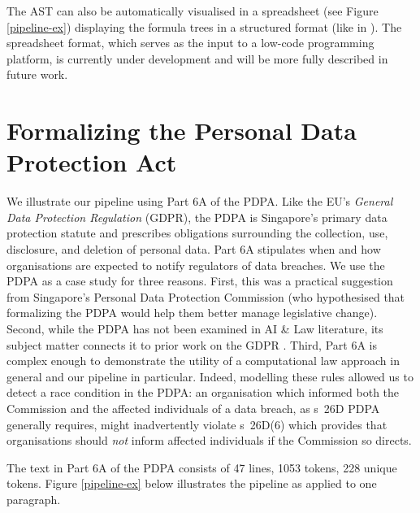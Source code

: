 \documentclass{IOS-Book-Article}
\begin{document}
The AST can also be automatically visualised in a spreadsheet (see Figure \ref{pipeline-ex}) displaying the formula trees in a structured format (like in \cite{mochales_study_2008}). The spreadsheet format, which serves as the input to a low-code programming platform, is currently under development and will be more fully described in future work.

\section{Formalizing the Personal Data Protection Act}
\label{sec:pdpa}

We illustrate our pipeline using Part 6A of the PDPA. Like the EU's \textit{General Data Protection Regulation} (GDPR), the PDPA is Singapore's primary data protection statute and prescribes obligations surrounding the collection, use, disclosure, and deletion of personal data. Part 6A stipulates when and how organisations are expected to notify regulators of data breaches. We use the PDPA as a case study for three reasons. First, this was a practical suggestion from Singapore's Personal Data Protection Commission (who hypothesised that formalizing the PDPA would help them better manage legislative change).
Second, while the PDPA has not been examined in AI \& Law literature, its subject matter connects it to prior work on the GDPR \cite{palmirani_modelling_2018,palmirani_legal_2018,hickey_gdpr_2021}.
Third, Part 6A is complex enough to demonstrate the utility of a computational law approach in general and our pipeline in particular. Indeed, modelling these rules allowed us to detect a race condition in the PDPA: an organisation which informed both the Commission and the affected individuals of a data breach, as s~26D PDPA generally requires, might inadvertently violate s~26D(6) which provides that organisations should \textit{not} inform affected individuals if the Commission so directs.

The text in Part 6A of the PDPA consists of 47 lines, 1053 tokens, 228 unique tokens.
Figure \ref{pipeline-ex} below illustrates the pipeline as applied to one paragraph.
\end{document}
